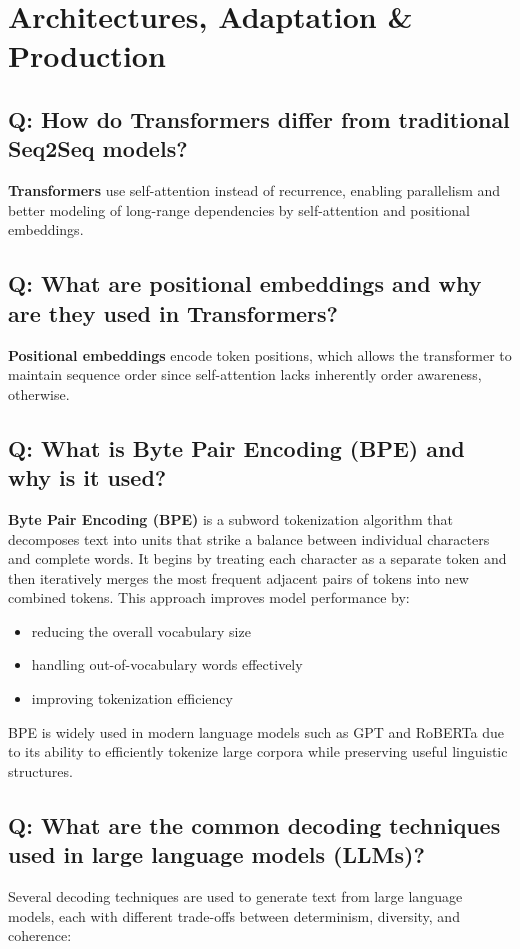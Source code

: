 \documentclass[11pt]{article}
\begin{document}
\section{Architectures, Adaptation \& Production}

\subsection*{Q: How do Transformers differ from traditional Seq2Seq models?}
\textbf{Transformers} use self-attention instead of recurrence, enabling parallelism and better modeling of long-range dependencies by self-attention and positional embeddings.

\subsection*{Q: What are positional embeddings and why are they used in Transformers?}
\textbf{Positional embeddings} encode token positions, which allows the transformer to maintain sequence order since self-attention lacks inherently order awareness, otherwise.

\subsection*{Q: What is Byte Pair Encoding (BPE) and why is it used?}
\textbf{Byte Pair Encoding (BPE)} is a subword tokenization algorithm that decomposes text into units that strike a balance between individual characters and complete words. It begins by treating each character as a separate token and then iteratively merges the most frequent adjacent pairs of tokens into new combined tokens. This approach improves model performance by:
\begin{itemize}
	\item reducing the overall vocabulary size
	\item handling out-of-vocabulary words effectively
	\item improving tokenization efficiency
\end{itemize}

BPE is widely used in modern language models such as GPT and RoBERTa due to its ability to efficiently tokenize large corpora while preserving useful linguistic structures.

\subsection*{Q: What are the common decoding techniques used in large language models (LLMs)?}
Several decoding techniques are used to generate text from large language models, each with different trade-offs between determinism, diversity, and coherence:
\end{document}
